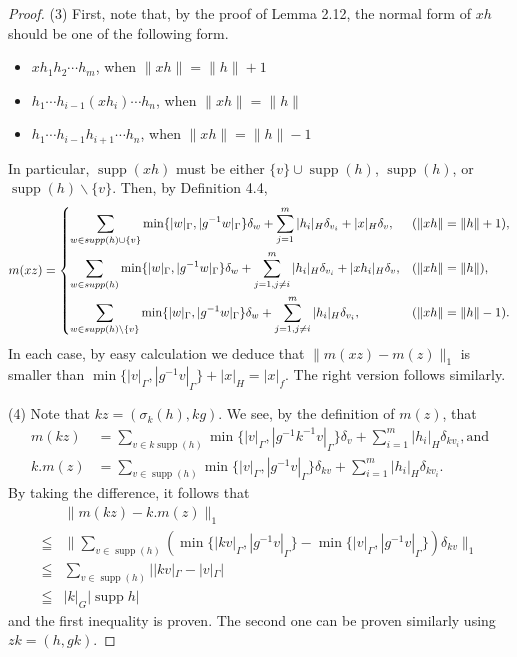 \documentclass[10pt,a4paper]{amsart}
\begin{document}
\begin{proof}
(3) First, note that, by the proof of Lemma 2.12, the normal form of $xh$ should be one of the following form. 
\begin{itemize}
\item $xh_1h_2\cdots h_m$, when $\|xh\| = \| h\| +1$
\item $h_1\cdots h_{i-1}(xh_i)\cdots h_n$,  when $\|xh\| = \| h\|$
\item $h_1\cdots h_{i-1}h_{i+1}\cdots h_n$, when $\|xh\| = \| h\| -1$
\end{itemize}
In particular, $\mathop{supp}(xh)$ must be either $\{v\} \cup \mathop{supp}(h)$,  $\mathop{supp}(h)$, or $\mathop{supp}(h) \backslash \{ v \}$. 
Then, by Definition 4.4, 
\begin{align}
m(xz) = 
\begin{dcases}
\sum_{w\in \mathop{supp}(h)\cup \{ v \}} \min\{ |w|_{\Gamma}, |g^{-1}w|_{\Gamma}\} \delta_{w}+ \sum_{j=1}^m |h_i|_{H} \delta_{v_i} + |x|_H\delta_v,  
& (\|xh\| = \| h\| +1), \\
\sum_{w\in \mathop{supp}(h)} \min\{ |w|_{\Gamma}, |g^{-1}w|_{\Gamma}\} \delta_{w}+ \sum_{j=1, j\neq i}^m |h_i|_{H} \delta_{v_i} + |xh_i|_H\delta_v,  
& (\|xh\| = \| h\| ), \\
\sum_{w\in \mathop{supp}(h)\backslash \{ v \}} \min\{ |w|_{\Gamma}, |g^{-1}w|_{\Gamma}\} \delta_{w}+ \sum_{j=1, j\neq i}^m |h_i|_{H} \delta_{v_i}, 
& (\|xh\| = \| h\| -1).
\end{dcases}
\end{align}
In each case, by easy calculation we deduce that $\| m(xz)-m(z) \|_1 $ is smaller than $\min\{ |v|_{\Gamma}, |g^{-1}v|_{\Gamma}\} + |x|_H = |x|_f$. 
The right version follows similarly. 

(4) Note that $kz=(\sigma_k(h), kg)$. We see, by the definition of $m(z)$, that
\begin{align}
m(kz) &= \sum_{v\in k\mathop{supp}(h)} \min\{ |v|_{\Gamma}, |g^{-1}k^{-1}v|_{\Gamma}\} \delta_{v}+ \sum_{i=1}^m |h_i|_{H} \delta_{kv_i}, \text{and}
\\
k.m(z) &= \sum_{v\in \mathop{supp}(h)} \min\{ |v|_{\Gamma}, |g^{-1}v|_{\Gamma}\} \delta_{kv}+ \sum_{i=1}^m |h_i|_{H} \delta_{kv_i}. 
\end{align}
By taking the difference, it follows that 
\begin{align}
&\| m(kz)-k.m(z) \|_1 \\
\leqq 
&\| \sum_{v\in \mathop{supp}(h)} (\min\{ |kv|_{\Gamma}, |g^{-1}v|_{\Gamma}\} - \min\{ |v|_{\Gamma}, |g^{-1}v|_{\Gamma}\}) \delta_{kv} \|_1 \\
\leqq 
&\sum_{v\in \mathop{supp}(h)} | |kv|_{\Gamma} - |v|_{\Gamma} | \\
\leqq 
&|k|_G|\mathop{supp}h|
\end{align}
and the first inequality is proven. The second one can be proven similarly using 
$zk=(h,gk)$. 
\end{proof}
\end{document}
